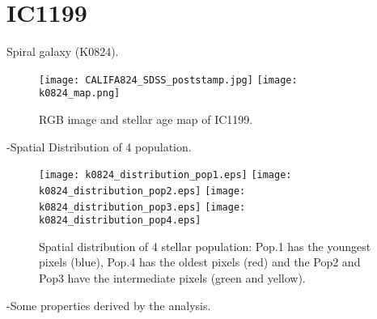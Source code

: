 \newpage
\section*{IC1199}
Spiral galaxy (K0824).

\begin{figure}[bh]
\begin{center}
\texttt{[image: CALIFA824\_SDSS\_poststamp.jpg]}
\texttt{[image: k0824\_map.png]}
\caption{RGB image and stellar age map of IC1199.}
   \label{fig1}
\end{center}
\end{figure}

-Spatial Distribution of 4 population.


\begin{figure}[bh]
\begin{center}
\texttt{[image: k0824\_distribution\_pop1.eps]}
\texttt{[image: k0824\_distribution\_pop2.eps]}
\texttt{[image: k0824\_distribution\_pop3.eps]}
\texttt{[image: k0824\_distribution\_pop4.eps]}
 \caption{Spatial distribution of 4 stellar population: Pop.1 has the youngest pixels (blue), Pop.4 has the oldest pixels (red) and the Pop2 and Pop3 have the intermediate pixels (green and yellow).}
   \label{fig1}
\end{center}
\end{figure}



-Some properties derived by the analysis.


